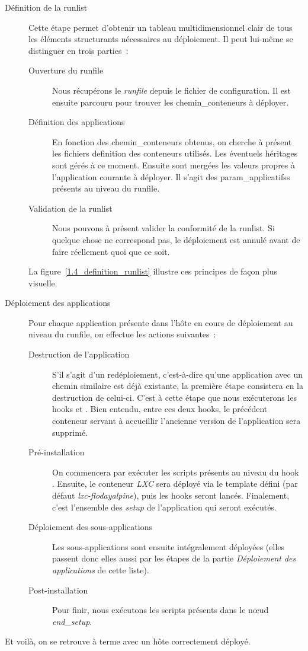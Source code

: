 \begin{description}
	\item[Définition de la \gls{runlist}]
		Cette étape permet d'obtenir un tableau multidimensionnel clair de tous les éléments structurants nécessaires au déploiement.
		Il peut lui-même se distinguer en trois parties~:
		\begin{description}
			\item[Ouverture du \gls{runfile}]
				Nous récupérons le \emph{runfile} depuis le fichier de configuration.
				Il est ensuite parcouru pour trouver les \glspl{chemin_conteneur} à déployer.
			\item[Définition des applications]
				En fonction des \glspl{chemin_conteneur} obtenus, on cherche à présent les fichiers \gls{definition} des conteneurs utilisés.
				Les éventuels héritages sont gérés à ce moment.
				Ensuite sont mergées les valeurs propres à l'application courante à déployer.
				Il s'agit des \glspl{param_applicatifs} présents au niveau du runfile.
			\item[Validation de la runlist]
				Nous pouvons à présent valider la conformité de la \gls{runlist}.
				Si quelque chose ne correspond pas, le déploiement est annulé avant de faire réellement quoi que ce soit.
		\end{description}
		La figure~\ref{1.4_definition_runlist} illustre ces principes de façon plus visuelle.
	\item[Déploiement des applications]
		Pour chaque application présente dans l'hôte en cours de déploiement au niveau du runfile, on effectue les actions suivantes~:
			\begin{description}
				\item[Destruction de l'application]
					S'il s'agit d'un redéploiement, c'est-à-dire qu'une application avec un chemin similaire est déjà existante, la première étape consistera en la destruction de celui-ci.
					C'est à cette étape que nous exécuterons les hooks  et . Bien entendu, entre ces deux hooks, le précédent conteneur servant à accueillir l'ancienne version de l'application sera supprimé.
				\item[Pré-installation]
					On commencera par exécuter les scripts présents au niveau du hook .
					Ensuite, le conteneur \emph{LXC} sera déployé via le template défini (par défaut \emph{lxc-flodayalpine}), puis les hooks  seront lancés.
					Finalement, c'est l'ensemble des \emph{setup} de l'application qui seront exécutés.
				\item[Déploiement des sous-applications]
					Les \glspl{sous-application} sont ensuite intégralement déployées (elles passent donc elles aussi par les étapes de la partie \emph{Déploiement des applications} de cette liste).
				\item[Post-installation]
					Pour finir,  nous exécutons les scripts présents dans le nœud \emph{end\_setup}.
			\end{description}
\end{description}
Et voilà, on se retrouve à terme avec un hôte correctement déployé.

